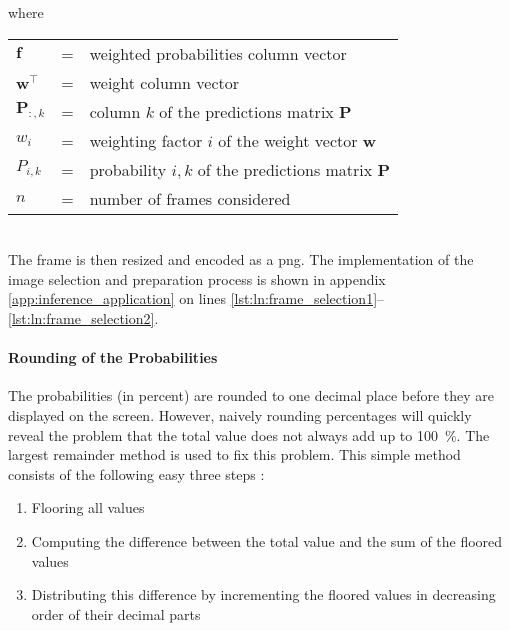 where

\begin{tabular}{lll}
  $\boldsymbol{f}$ & = & weighted probabilities column vector \\
  $\boldsymbol{w}^\top$ & = & weight column vector \\
  $\boldsymbol{P}_{:,k}$ & = & column $k$ of the predictions matrix $\boldsymbol{P}$ \\
  $w_i$ & = & weighting factor $i$ of the weight vector $\boldsymbol{w}$ \\
  $P_{i,k}$ & = & probability $i,k$ of the predictions matrix $\boldsymbol{P}$ \\
  $n$ & = & number of frames considered \\
\end{tabular}
\\

The frame is then resized and encoded as a \acrshort{png}.
The implementation of the image selection and preparation process is shown in appendix \ref{app:inference_application} on lines \ref{lst:ln:frame_selection1}--\ref{lst:ln:frame_selection2}.

\paragraph{Rounding of the Probabilities}
The probabilities (in percent) are rounded to one decimal place before they are displayed on the screen.
However, naively rounding percentages will quickly reveal the problem that the total value does not always add up to \SI{100}{\percent}.
The largest remainder method is used to fix this problem.
This simple method consists of the following easy three steps \cite{}: %
\begin{enumerate}
  \item Flooring all values
  \item Computing the difference between the total value and the sum of the floored values
  \item Distributing this difference by incrementing the floored values in decreasing order of their decimal parts
\end{enumerate}

